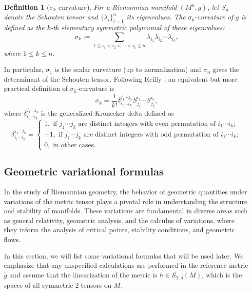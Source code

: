 \documentclass[12pt]{amsart}
\newtheorem{define}{Definition}[section]
\newcommand{\bg}{\bar{g}}
\numberwithin{equation}{section}
\begin{document}
\begin{define}[$\sigma_k$-curvature]
For a Riemannian manifold $(M^n,g)$, let $S_g$ denote the Schouten tensor and $\{\lambda_i\}_{i=1}^n$ its eigenvalues. The $\sigma_k$-curvature of $g$ is defined as the $k$-th elementary symmetric polynomial of these eigenvalues:
\begin{equation*}
    \sigma_k := \sum_{1\leq i_1 < i_2 < \cdots < i_k \leq n} \lambda_{i_1}\lambda_{i_2}\cdots\lambda_{i_k},
\end{equation*}
where $1 \leq k \leq n$. 
\end{define}
In particular, $\sigma_1$ is the scalar curvature (up to normalization) and $\sigma_n$ gives the determinant of the Schouten tensor. Following Reilly \cite{Robert1}, an equivalent but more practical definition of $\sigma_k$-curvature is
\begin{equation}\label{eq: sigmak}
    \sigma_k=\frac{1}{k!}\delta_{i_1\cdots i_k}^{j_1\cdots j_k}S_{j_1}^{i_1}\cdots S_{j_k}^{i_k},
\end{equation}
where $\delta_{i_1\cdots i_k}^{j_1\cdots j_k}$ is the generalized Kronecker delta defined as 
\begin{equation*}
    \delta_{i_1\cdots i_k}^{j_1\cdots j_k}=
    \begin{cases}
        1, \text{ if } j_1\cdots j_k \text{ are distinct integers with even permutation of } i_1\cdots i_k;\\
        -1, \text{ if } j_1\cdots j_k \text{ are distinct integers with odd permutation of } i_1\cdots i_k;\\
        0, \text{ in other cases.}
    \end{cases}
\end{equation*}

\subsection{Geometric variational formulas}

In the study of Riemannian geometry, the behavior of geometric quantities under variations of the metric tensor plays a pivotal role in understanding the structure and stability of manifolds. These variations are fundamental in diverse areas such as general relativity, geometric analysis, and the calculus of variations, where they inform the analysis of critical points, stability conditions, and geometric flows.

In this section, we will list some variational formulas that will be used later. We emphasize that any unspecified calculations are performed in the reference metric $\bg$ and assume that the linearization of the metric is $h\in\mathcal{S}_{2,\bg}(M)$, which is the spaces of all symmetric 2-tensors on $M$.
\end{document}
